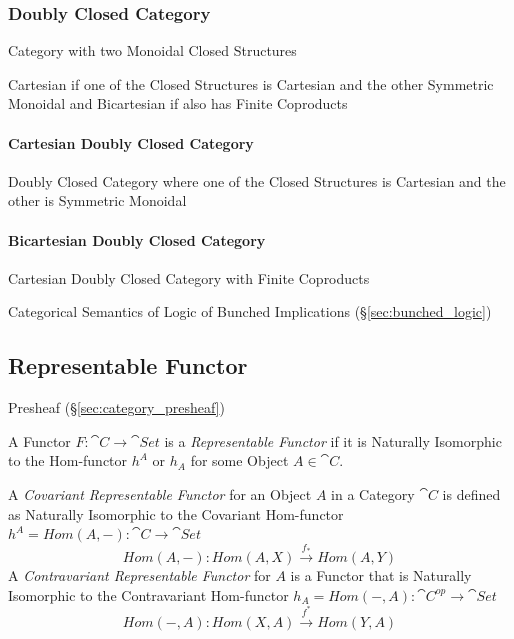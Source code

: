 \subsubsection{Doubly Closed Category}\label{sec:doubly_closed_category}

Category with two Monoidal Closed Structures

Cartesian if one of the Closed Structures is Cartesian and the other
Symmetric Monoidal and Bicartesian if also has Finite Coproducts



\paragraph{Cartesian Doubly Closed Category}
\label{sec:cartesian_doubly_closed}\hfill

Doubly Closed Category where one of the Closed Structures is Cartesian
and the other is Symmetric Monoidal



\paragraph{Bicartesian Doubly Closed Category}
\label{sec:bicartesian_doubly_closed}\hfill

Cartesian Doubly Closed Category with Finite Coproducts

Categorical Semantics of Logic of Bunched Implications
(\S\ref{sec:bunched_logic})



\subsection{Representable Functor}\label{sec:representable_functor}

Presheaf (\S\ref{sec:category_presheaf})

A Functor $F : \cat{C} \rightarrow \cat{Set}$ is a
\emph{Representable Functor} if it is Naturally Isomorphic to the
Hom-functor $h^A$ or $h_A$ for some Object $A \in \cat{C}$.

A \emph{Covariant Representable Functor} for an Object $A$ in a
Category $\cat{C}$ is defined as Naturally Isomorphic to the
Covariant Hom-functor $h^A = Hom(A,-) : \cat{C} \rightarrow
\cat{Set}$
\[
  Hom(A,-) : Hom(A,X) \xrightarrow{f_*} Hom(A,Y)
\]
A \emph{Contravariant Representable Functor} for $A$ is a Functor that
is Naturally Isomorphic to the Contravariant Hom-functor $h_A =
Hom(-,A) : \cat{C^{op}} \rightarrow \cat{Set}$
\[
  Hom(-,A) : Hom(X,A) \xrightarrow{f^*} Hom(Y,A)
\]

